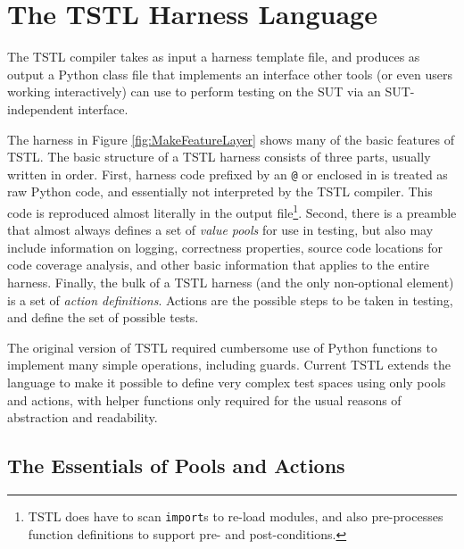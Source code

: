 \section{The TSTL Harness Language}
\label{sec:lang}

The TSTL compiler takes as input a harness template file, and produces
as output a Python class file that implements an interface other tools
(or even users working interactively)
can use to perform testing on the SUT via an SUT-independent interface.

The harness in Figure \ref{fig:MakeFeatureLayer} shows many of the
basic features of TSTL.  The basic structure of a TSTL harness
consists of three parts, usually written in order.  First, harness
code prefixed by an {\tt @} or enclosed in {\tt <@ @>} is treated as
raw Python code, and essentially not interpreted by the TSTL
compiler.  This code is reproduced almost literally in the output
file\footnote{TSTL does have to scan {\tt import}s to re-load modules, and also pre-processes function
  definitions to support
pre- and post-conditions.}.  Second, there is a preamble that almost
always defines a set of \emph{value pools} for use in testing, but
also may include information on logging, correctness properties,
source code locations for code coverage analysis, and other basic
information that applies to the entire harness.  Finally, the bulk of
a TSTL harness (and the only non-optional element) is a set of
\emph{action definitions}.  Actions are the possible steps to be taken in
testing, and define the set of possible tests.

The original version of TSTL \cite{NFM15} required cumbersome use of Python
functions to implement many simple operations, including guards.  Current TSTL extends
the language to make it possible to define very complex test spaces
using only pools and actions, with helper functions only required for
the usual reasons of abstraction and readability.

\subsection{The Essentials of Pools and Actions}

